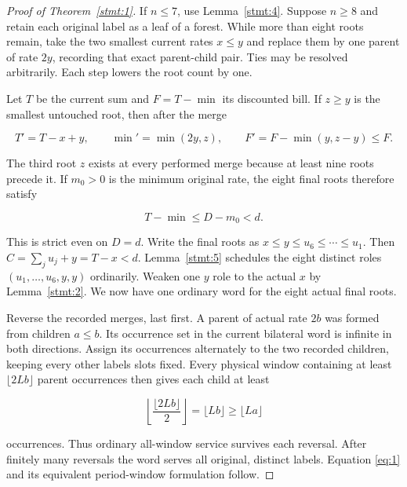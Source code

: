 \documentclass[11pt,a4paper]{article}
\begin{document}
\begin{proof}[Proof of Theorem~\ref{stmt:1}]

 If \(n\le7\), use Lemma~\ref{stmt:4}. Suppose \(n\ge8\) and retain each original label as a leaf of a forest. While more than eight roots remain, take the two smallest current rates \(x\le y\) and replace them by one parent of rate \(2y\), recording that exact parent-child pair. Ties may be resolved arbitrarily. Each step lowers the root count by one.

Let \(T\) be the current sum and \(F=T-\min\) its discounted bill. If \(z\ge y\) is the smallest untouched root, then after the merge

\begin{equation}
T'=T-x+y,\qquad \min'=\min(2y,z),\qquad
 F'=F-\min(y,z-y)\le F.
\tag{5}\label{eq:5}
\end{equation}

The third root \(z\) exists at every performed merge because at least nine roots precede it. If \(m_0>0\) is the minimum original rate, the eight final roots therefore satisfy

\begin{equation}
T-\min\le D-m_0<d.
\tag{6}\label{eq:6}
\end{equation}

This is strict even on \(D=d\). Write the final roots as \(x\le y\le u_6\le\cdots\le u_1\). Then \(C=\sum_j u_j+y=T-x<d\). Lemma~\ref{stmt:5} schedules the eight distinct roles \((u_1,\ldots,u_6,y,y)\) ordinarily. Weaken one \(y\) role to the actual \(x\) by Lemma~\ref{stmt:2}. We now have one ordinary word for the eight actual final roots.

Reverse the recorded merges, last first. A parent of actual rate \(2b\) was formed from children \(a\le b\). Its occurrence set in the current bilateral word is infinite in both directions. Assign its occurrences alternately to the two recorded children, keeping every other label\textquotesingle s slots fixed. Every physical window containing at least \(\lfloor2Lb\rfloor\) parent occurrences then gives each child at least

\begin{equation}
\left\lfloor\frac{\lfloor2Lb\rfloor}{2}\right\rfloor
     =\lfloor Lb\rfloor\ge\lfloor La\rfloor
\tag{7}\label{eq:7}
\end{equation}

occurrences. Thus ordinary all-window service survives each reversal. After finitely many reversals the word serves all original, distinct labels. Equation \eqref{eq:1} and its equivalent period-window formulation follow. 

\end{proof}
\end{document}
